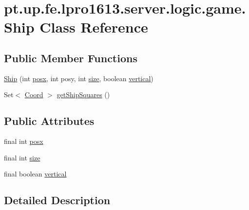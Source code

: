 \hypertarget{classpt_1_1up_1_1fe_1_1lpro1613_1_1server_1_1logic_1_1game_1_1_ship}{}\section{pt.\+up.\+fe.\+lpro1613.\+server.\+logic.\+game.\+Ship Class Reference}
\label{classpt_1_1up_1_1fe_1_1lpro1613_1_1server_1_1logic_1_1game_1_1_ship}
\subsection*{Public Member Functions}
\begin{DoxyCompactItemize}
\item 
\hyperlink{classpt_1_1up_1_1fe_1_1lpro1613_1_1server_1_1logic_1_1game_1_1_ship_a429cc1e75d290ba2af4e45e3d9325532}{Ship} (int \hyperlink{classpt_1_1up_1_1fe_1_1lpro1613_1_1server_1_1logic_1_1game_1_1_ship_a20376fae088f39d333583ac151fc0a6c}{posx}, int posy, int \hyperlink{classpt_1_1up_1_1fe_1_1lpro1613_1_1server_1_1logic_1_1game_1_1_ship_aa966a4a795539d4ae92405b39d13bc75}{size}, boolean \hyperlink{classpt_1_1up_1_1fe_1_1lpro1613_1_1server_1_1logic_1_1game_1_1_ship_ace9d9d5c8d7dafd941ade2281e90687f}{vertical})
\item 
Set$<$ \hyperlink{classpt_1_1up_1_1fe_1_1lpro1613_1_1sharedlib_1_1utils_1_1_coord}{Coord} $>$ \hyperlink{classpt_1_1up_1_1fe_1_1lpro1613_1_1server_1_1logic_1_1game_1_1_ship_ad33640a8641153ce7758d7c4613e02cb}{get\+Ship\+Squares} ()
\end{DoxyCompactItemize}
\subsection*{Public Attributes}
\begin{DoxyCompactItemize}
\item 
final int \hyperlink{classpt_1_1up_1_1fe_1_1lpro1613_1_1server_1_1logic_1_1game_1_1_ship_a20376fae088f39d333583ac151fc0a6c}{posx}
\item 
final int \hyperlink{classpt_1_1up_1_1fe_1_1lpro1613_1_1server_1_1logic_1_1game_1_1_ship_aa966a4a795539d4ae92405b39d13bc75}{size}
\item 
final boolean \hyperlink{classpt_1_1up_1_1fe_1_1lpro1613_1_1server_1_1logic_1_1game_1_1_ship_ace9d9d5c8d7dafd941ade2281e90687f}{vertical}
\end{DoxyCompactItemize}


\subsection{Detailed Description}


